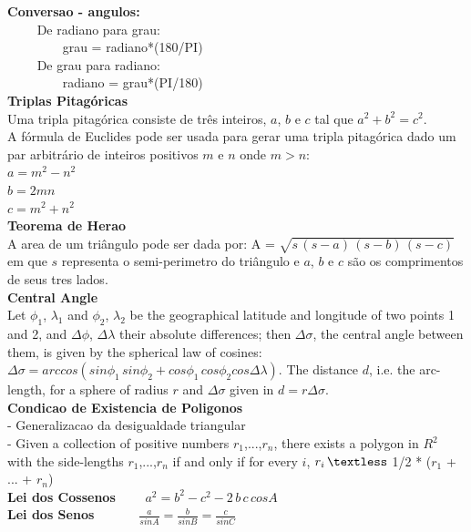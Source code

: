 \documentclass[10pt, twocolumn]{article}
\begin{document}
\begin{flushleft}
\textbf{Conversao - angulos:}\\
$\qquad$ De radiano para grau:\\
$\qquad \qquad$ grau = radiano*(180/PI)\\
$\qquad$ De grau para radiano:\\
$\qquad \qquad$ radiano = grau*(PI/180)\\[0.5cm]

\textbf{Triplas Pitagóricas}\\
Uma tripla pitagórica consiste de três inteiros, $a$, $b$ e $c$ tal que $a^2 + b^2 = c^2$.\\
A fórmula de Euclides pode ser usada para gerar uma tripla pitagórica dado um par arbitrário de inteiros positivos $m$ e $n$ onde $m > n$:\\
$a = m^2 - n^2$\\
$b = 2mn$\\
$c = m^2 + n^2$\\[0.5cm]

\textbf{Teorema de Herao}\\
A area de um triângulo pode ser dada por: A = $\sqrt{s\,(s-a)\,(s-b)\,(s-c)}$ em que $s$ representa o semi-perimetro do triângulo e $a$, $b$ e $c$ são os comprimentos de seus tres lados.\\[0.5cm]

\textbf{Central Angle}\\
Let $\phi_1$, $\lambda_1$ and $\phi_2$, $\lambda_2$ be the geographical latitude and longitude of two points 1 and 2, and $\Delta\phi$, $\Delta\lambda$ their absolute differences; then $\Delta\sigma$, the central angle between them, is given by the spherical law of cosines: $\Delta\sigma = arccos(sin\phi_1 \, sin\phi_2 + cos\phi_1 \, cos\phi_2 cos\Delta\lambda).$ The distance $d$, i.e. the arc-length, for a sphere of radius $r$ and $\Delta\sigma$ given in $d = r\Delta\sigma$.\\[0.5cm]

\textbf{Condicao de Existencia de Poligonos}\\
- Generalizacao da desigualdade triangular\\
- Given a collection of positive numbers $r_1$,...,$r_n$, there exists a polygon in $R^{2}$ with the side-lengths $r_1$,...,$r_n$ if and only if for every $i$, $r_i \, \textless $  1/2 * ($r_1$ + ... + $r_n$)\\[0.5cm]

\textbf{Lei dos Cossenos} $\qquad a^{2} = b^{2} - c^{2} - 2\,b\,c\,cosA$\\
\textbf{Lei dos Senos} $\, \quad \qquad \frac{a}{sin A} = \frac{b}{sin B} = \frac{c}{sin C}$





\end{flushleft}
\end{document}
